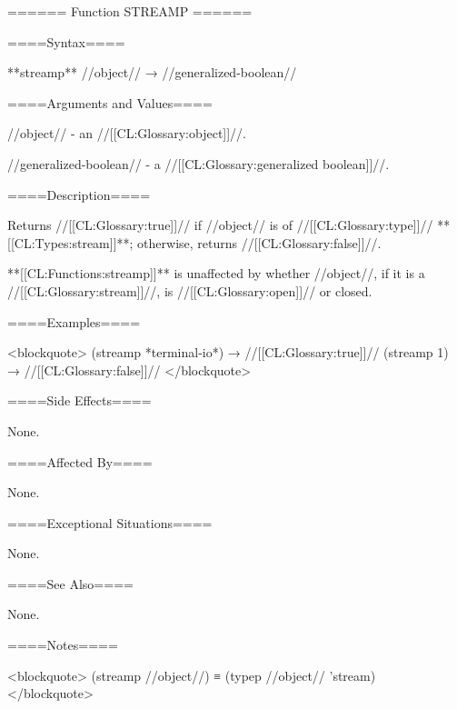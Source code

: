 ====== Function STREAMP ======

====Syntax====

**{streamp}** //object// → //generalized-boolean//

====Arguments and Values====

//object// - an //[[CL:Glossary:object]]//.

//generalized-boolean// - a //[[CL:Glossary:generalized boolean]]//.

====Description====

Returns //[[CL:Glossary:true]]// if //object// is of //[[CL:Glossary:type]]// **[[CL:Types:stream]]**; otherwise, returns //[[CL:Glossary:false]]//.

**[[CL:Functions:streamp]]** is unaffected by whether //object//, if it is a //[[CL:Glossary:stream]]//, is //[[CL:Glossary:open]]// or closed.

====Examples====

<blockquote> (streamp *terminal-io*) → //[[CL:Glossary:true]]// (streamp 1) → //[[CL:Glossary:false]]// </blockquote>

====Side Effects====

None.

====Affected By====

None.

====Exceptional Situations====

None.

====See Also====

None.

====Notes====

<blockquote> (streamp //object//) ≡ (typep //object// 'stream) </blockquote>

